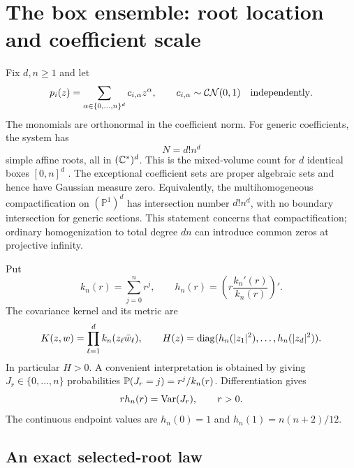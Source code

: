 \section{The box ensemble: root location and coefficient scale}\label{sec:box}

Fix $d,n\ge1$ and let
\begin{equation}\label{eq:box-model}
 p_i(z)=\sum_{\alpha\in\{0,\ldots,n\}^d}c_{i,\alpha}z^\alpha,
 \qquad c_{i,\alpha}\sim\mathcal{CN}(0,1)\quad\hbox{independently}.
\end{equation}
The monomials are orthonormal in the coefficient norm. For generic coefficients,
the system has
\begin{equation}\label{eq:box-count}
 N=d!n^d
\end{equation}
simple affine roots, all in $(\mathbb C^*)^d$. This is the mixed-volume count for
$d$ identical boxes $[0,n]^d$ \cite{bernstein1975roots,cox2005using}.
The exceptional coefficient sets are proper algebraic sets and hence have
Gaussian measure zero. Equivalently, the multihomogeneous compactification
on $(\mathbb P^1)^d$ has intersection number $d!n^d$, with no boundary
intersection for generic sections. This statement concerns that
compactification; ordinary homogenization to total degree $dn$ can introduce
common zeros at projective infinity.

Put
\[
 k_n(r)=\sum_{j=0}^n r^j,\qquad
 h_n(r)=\left(r\frac{k_n'(r)}{k_n(r)}\right)'.
\]
The covariance kernel and its metric are
\begin{equation}\label{eq:box-kernel}
 K(z,w)=\prod_{\ell=1}^d k_n(z_\ell\bar w_\ell),\qquad
 H(z)=\operatorname{diag}(h_n(|z_1|^2),\ldots,h_n(|z_d|^2)).
\end{equation}
In particular $H>0$. A convenient interpretation is obtained by giving
$J_r\in\{0,\ldots,n\}$ probabilities
$\mathbb P(J_r=j)=r^j/k_n(r)$. Differentiation gives
\begin{equation}\label{eq:box-variance}
 r h_n(r)=\operatorname{Var}(J_r),\qquad r>0.
\end{equation}
The continuous endpoint values are $h_n(0)=1$ and
$h_n(1)=n(n+2)/12$.

\subsection{An exact selected-root law}

